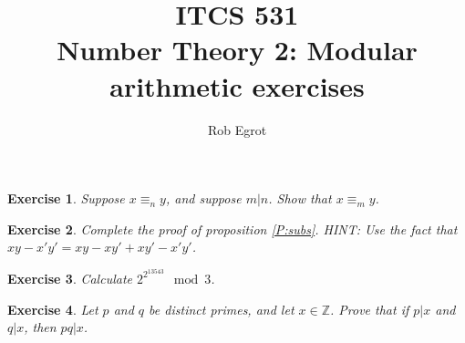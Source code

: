\documentclass{article}
\title{ITCS 531 \\Number Theory 2: Modular arithmetic exercises}
\author{Rob Egrot}
\date{}
\theoremstyle{plain}
\newtheorem{Q}{Exercise}{\bfseries}{\upshape}
\newcommand{\bZ}{\mathbb{Z}}
\begin{document}
\maketitle

\begin{Q}
Suppose $x\equiv_n y$, and suppose $m|n$. Show that $x\equiv_m y$.
\end{Q}
\begin{comment}
\textbf{Solution:} Suppose $x-y= kn$, and $n = am$. Then $x-y = (ka)m$.
\end{comment}

\begin{Q}\label{\prefix Q:subs}
Complete the proof of proposition \ref{P:subs}. HINT: Use the fact that $xy - x'y' = xy - xy' +xy' - x'y'$.
\end{Q}
\begin{comment}
\textbf{Solution:} Suppose $(x-x') = kn$, and $(y-y') = ln$. Note that 
\begin{align*}xy - x'y' &= xy - xy' + xy' - x'y'\\
&= x(y-y') - y'(x-x') \\
&= xln - y'kn \\
&= (xl-y'k)n. 
\end{align*}
\end{comment}


\begin{Q}
Calculate $2^{2^{13543}}\mod 3$.
\end{Q}
\begin{comment}
\textbf{Solution:}
$2 \equiv_3 -1$, and $2^{13543}$ is an even number. Since $-1$ to the power of any even number is 1, we must have $2^{2^{13543}}\equiv_3 1$. We're using proposition 2.8 in the background here. This is what tells us that $2^{2^{13543}} \equiv_3 (-1)^{2^{13543}}$. More generally, if $x \equiv_n y$ then $x^k \equiv_n y^k$ for all $n$ and $k$.
\end{comment}

\begin{Q}\label{\prefix Q:pdiv}
Let $p$ and $q$ be distinct primes, and let $x\in\bZ$. Prove that if $p|x$ and $q|x$, then $pq|x$.
\end{Q}
\begin{comment}
\textbf{Solution:}
We know that $x = (\pm 1)p_1\ldots p_n$ for some sequence of primes $p_1,\ldots, p_n$. This is the easy half of the Fundamental Theorem of Arithmetic. Also, by lemma 1.9, since $p|p_1\ldots p_n$ we must have $p = p_i$ for some $i\in \{1,\ldots,n\}$. We also have $q|x$, and so $q = p_j$ for some $j\in\{1,\ldots,n\}$, by the same argument. Since $p$ and $q$ are distinct, we can't have $i = j$. Assume without loss of generality that $i=1$ and $j=2$. Then $x = (\pm 1)(pq)p_3\ldots p_n$, and so $pq|x$.   
\end{comment}
\end{document}
